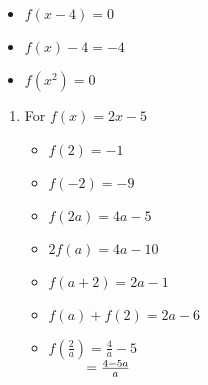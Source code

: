 \begin{enumerate}
\begin{multicols}{3}
\begin{itemize}

\item  $f(x-4) = 0$ 

\item $f(x) - 4 = -4$
     
\item  $f\left(x^2\right) = 0$

\end{itemize}
\end{multicols}

\setcounter{HW}{\value{enumi}}
\end{enumerate}




\begin{enumerate}
\setcounter{enumi}{\value{HW}}

\item For $f(x) = 2x-5$

\begin{multicols}{3}
\begin{itemize}

\item  $f(2) = -1$
\item  $f(-2) = -9$
\item  $f(2a) = 4a-5$

\end{itemize}
\end{multicols}

\begin{multicols}{3}
\begin{itemize}

\item  $2 f(a) = 4a-10$
\item $f(a+2) = 2a-1$
\item $f(a) + f(2) = 2a-6$

\end{itemize}
\end{multicols}

\begin{multicols}{3}
\begin{itemize}

\item  $f \left( \frac{2}{a} \right) = \frac{4}{a} - 5$ \\
$\hphantom{f \left( \frac{2}{a} \right)} = \frac{4-5a}{a}$

\vfill

\columnbreak


\end{itemize}
\end{multicols}
\end{enumerate}
